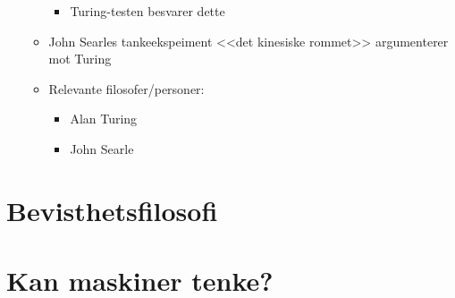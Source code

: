 \begin{itemize}
\begin{itemize}
                    \begin{itemize}
                        \item Turing-testen besvarer dette
                    \end{itemize}
              \item John Searles tankeekspeiment <<det kinesiske rommet>> argumenterer \\mot Turing
              \item Relevante filosofer/personer:
                    \begin{itemize}
                        \item Alan Turing
                        \item John Searle
                    \end{itemize}
          \end{itemize}
\end{itemize}

\section*{Bevisthetsfilosofi}
\lipsum[1-2]

\section*{Kan maskiner tenke?}
\lipsum[1-2]

\parencite{neufeld2013reviews}

\printbibliography[heading=bibintoc] %

